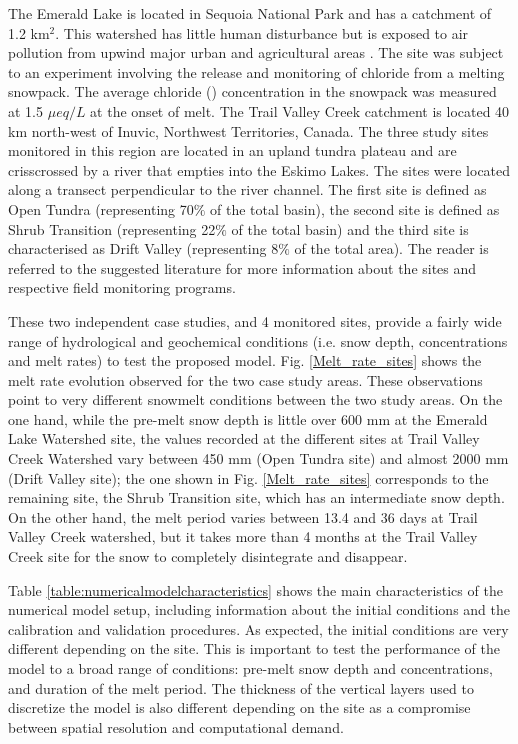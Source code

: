 \documentclass[authoryear,preprint,review,12pt]{elsarticle}
\begin{document}
The Emerald Lake is located in Sequoia National Park and has a catchment of 1.2 km$^2$. This watershed has little human disturbance but is exposed to air pollution from upwind major urban and agricultural areas \citep{Tonnessen1991}. The site was subject to an experiment involving the release and monitoring of chloride from a melting snowpack. The average chloride () concentration in the snowpack was measured at 1.5 $\mu eq/L$ at the onset of melt. The Trail Valley Creek catchment is located 40 km north-west of Inuvic, Northwest Territories, Canada. The three study sites monitored in this region are located in an upland tundra plateau and are crisscrossed by a river that empties into the Eskimo Lakes. The sites were located along a transect perpendicular to the river channel. The first site is defined as Open Tundra (representing 70$\%$ of the total basin), the second site is defined as Shrub Transition (representing 22$\%$ of the total basin) and the third site is characterised as Drift Valley (representing $8\%$ of the total area). The reader is referred to the suggested literature for more information about the sites and respective field monitoring programs. \par

These two independent case studies, and 4 monitored sites, provide a fairly wide range of hydrological and geochemical conditions (i.e. snow depth, concentrations and melt rates) to test the proposed model. Fig. \ref{Melt_rate_sites} shows the melt rate evolution observed for the two case study areas. These observations point to very different snowmelt conditions between the two study areas. On the one hand, while the pre-melt snow depth is little over 600 mm at the Emerald Lake Watershed site, the values recorded at the different sites at Trail Valley Creek Watershed vary between 450 mm (Open Tundra site) and almost 2000 mm (Drift Valley site); the one shown in Fig. \ref{Melt_rate_sites} corresponds to the remaining site, the Shrub Transition site, which has an intermediate snow depth. On the other hand, the melt period varies between 13.4 and 36 days at Trail Valley Creek watershed, but it takes more than 4 months at the Trail Valley Creek site for the snow to completely disintegrate and disappear. \par

Table \ref{table:numericalmodelcharacteristics} shows the main characteristics of the numerical model setup, including information about the initial conditions and the calibration and validation procedures. As expected, the initial conditions are very different depending on the site. This is important to test the performance of the model to a broad range of conditions: pre-melt snow depth and  concentrations, and duration of the melt period. The thickness of the vertical layers used to discretize the model is also different depending on the site as a compromise between spatial resolution and computational demand.\par
\end{document}
